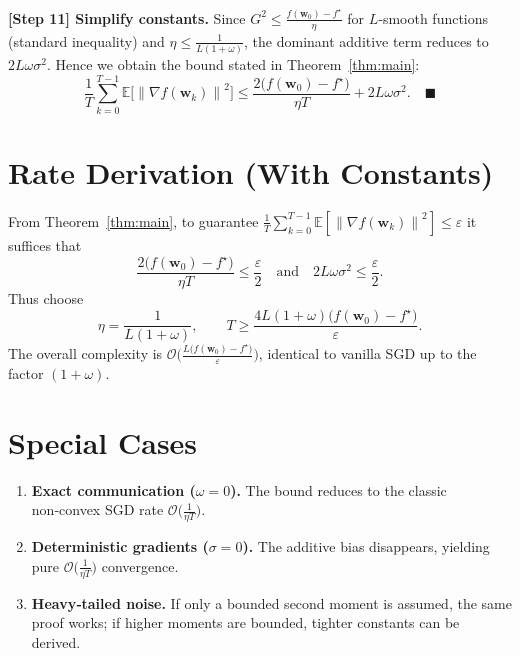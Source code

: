 \documentclass{article}
\newcommand{\E}{\mathbb{E}}
\newcommand{\norm}[1]{\left\lVert #1\right\rVert}
\begin{document}
\noindent\textbf{[Step 11] Simplify constants.}  
Since $G^{2}\le \frac{f(\bm w_0)-f^\star}{\eta}$ for $L$‑smooth functions (standard inequality) and $\eta\le\frac{1}{L(1+\omega)}$, the dominant additive term reduces to $2L\omega\sigma^{2}$. Hence we obtain the bound stated in Theorem~\ref{thm:main}:
\[
\frac{1}{T}\sum_{k=0}^{T-1}\E\!\big[\norm{\nabla f(\bm w_k)}^{2}\big]
\le \frac{2\big(f(\bm w_0)-f^\star\big)}{\eta T}+2L\omega\sigma^{2}.
\quad\blacksquare
\]

\section*{Rate Derivation (With Constants)}
From Theorem~\ref{thm:main}, to guarantee 
$\frac{1}{T}\sum_{k=0}^{T-1}\E[\norm{\nabla f(\bm w_k)}^{2}]\le\varepsilon$ it suffices that
\[
\frac{2\big(f(\bm w_0)-f^\star\big)}{\eta T}\le\frac{\varepsilon}{2}
\quad\text{and}\quad
2L\omega\sigma^{2}\le\frac{\varepsilon}{2}.
\]
Thus choose
\[
\eta = \frac{1}{L(1+\omega)} ,\qquad
T \ge \frac{4L(1+\omega)\big(f(\bm w_0)-f^\star\big)}{\varepsilon}.
\]
The overall complexity is $\mathcal O\!\big(\frac{L\big(f(\bm w_0)-f^\star\big)}{\varepsilon}\big)$, identical to vanilla SGD up to the factor $(1+\omega)$.

\section*{Special Cases}
\begin{enumerate}
\item \textbf{Exact communication ($\omega=0$).} The bound reduces to the classic non‑convex SGD rate $\mathcal O\!\big(\frac{1}{\eta T}\big)$.
\item \textbf{Deterministic gradients ($\sigma=0$).} The additive bias disappears, yielding pure $\mathcal O\big(\frac{1}{\eta T}\big)$ convergence.
\item \textbf{Heavy‑tailed noise.} If only a bounded second moment is assumed, the same proof works; if higher moments are bounded, tighter constants can be derived.
\end{enumerate}
\end{document}
